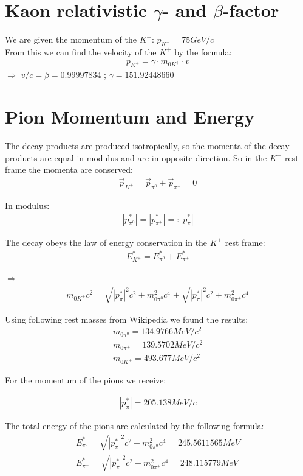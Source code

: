 \documentclass[a4paper,parskip,11pt, DIV12]{scrreprt}
\begin{document}
\section{Kaon relativistic $\gamma$- and $\beta$-factor} \label{sec:gammabeta}

We are given the momentum of the $K^+$: $p_{K^+} = 75 GeV/c$\\
From this we can find the velocity of the $K^+$ by the formula:
\begin{align*}
p_{K^+} = \gamma \cdot m_{0K^+} \cdot v
\end{align*}
$\Rightarrow$
$v/c = \beta = 0.99997834$ ;
$\gamma = 151.92448660$\\

\section{Pion Momentum and Energy} \label{sec:pE}

The decay products are produced isotropically, so the momenta of the decay products are equal in modulus and are in opposite direction. 
So in the $K^+$ rest frame the momenta are conserved:
\begin{align*}
\overrightarrow{p}_{K^+} = \overrightarrow{p}_{\pi^0} + \overrightarrow{p}_{\pi^+} = 0
\end{align*}

In modulus:
\begin{align*}
|p^*_{\pi^0}| = |p^*_{\pi^+}| =: |p^*_{\pi}|
\end{align*}

The decay obeys the law of energy conservation in the $K^+$ rest frame:
\begin{align*}
E^*_{K^+} = E^*_{\pi^0} + E^*_{\pi^+}
\end{align*}

$\Rightarrow$
\begin{align*}
m_{0K^+}c^2 = \sqrt{|p^*_{\pi}|^2c^2 + m_{0\pi^0}^2c^4} + \sqrt{|p^*_{\pi}|^2c^2 + m_{0\pi^+}^2c^4}
\end{align*}

Using following rest masses from Wikipedia we found the results:
\begin{align*}
m_{0\pi^0} = 134.9766 MeV/c^2\\
m_{0\pi^+} = 139.5702 MeV/c^2\\
m_{0K^+} = 493.677 MeV/c^2
\end{align*}

For the momentum of the pions we receive:

\begin{align*}
|p^*_{\pi}| = 205.138 MeV/c
\end{align*}

The total energy of the pions are calculated by the following formula:
\begin{align*}
E_{\pi^0}^* = \sqrt{|p^*_{\pi}|^2c^2 + m_{0\pi^0}^2c^4} = 245.5611565 MeV\\
E_{\pi^+}^* = \sqrt{|p^*_{\pi}|^2c^2 + m_{0\pi^+}^2c^4}= 248.115779 MeV
\end{align*}


\clearpage  

\end{document}
